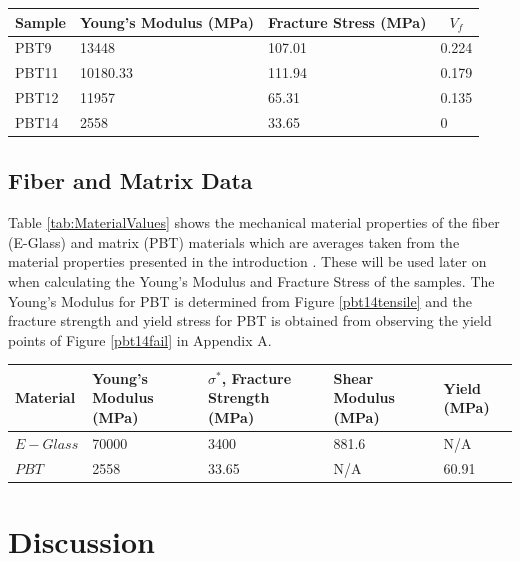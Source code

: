 \documentclass[11pt]{article}
\begin{document}
\begin{center}
 \label{tab:TestValues}
\begin{tabular}{p{1.5cm} || p{} | p{} | p{1.5cm} }
\hline
Sample & \multicolumn{1}{c|}{Young's Modulus (MPa)} & \multicolumn{1}{c|}{Fracture Stress (MPa)} & \multicolumn{1}{c}{\(V_f\)}  \\
\hline
\hline
PBT9 & 13448 & 107.01 & 0.224\\
PBT11 & 10180.33  & 111.94 & 0.179\\
PBT12 & 11957 & 65.31 & 0.135 \\
PBT14 & 2558 & 33.65 & 0\\
\hline
\end{tabular}
\end{center}
\singlespacing

\subsection{Fiber and Matrix Data}
Table \ref{tab:MaterialValues} shows the mechanical material properties of the fiber (E-Glass) and matrix (PBT) materials which are averages taken from the material properties presented in the introduction \cite{PBTmechProperties} \cite{course_notes}. These will be used later on when calculating the Young's Modulus and Fracture Stress of the samples. The Young's Modulus for PBT is determined from Figure \ref{pbt14tensile} and the fracture strength and yield stress for PBT is obtained from observing the yield points of Figure \ref{pbt14fail} in Appendix A.

\newpage
\begin{center}
 \label{tab:MaterialValues}
\begin{tabular}{p{2.5cm} || p{} | p{} | p{2.5cm} | p{} }
\hline
Material & Young's Modulus (MPa) & \(\sigma^*\), Fracture Strength (MPa) & Shear Modulus (MPa) & Yield (MPa)\\
\hline
\hline
\(E-Glass\) \cite{course_notes} & 70000 &  3400 & 881.6 & N/A \\
\(PBT\) \cite{PBTmechProperties} & 2558 & 33.65 & N/A & 60.91\\
\hline
\end{tabular}
\end{center}
\singlespacing

\section{Discussion}
\end{document}
